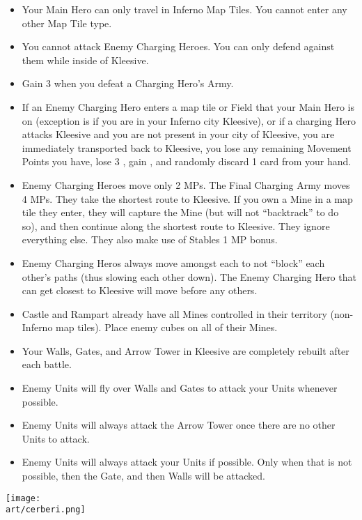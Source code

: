 \begin{multicols*}{2}
\begin{itemize}
  \item Your Main Hero can only travel in Inferno Map Tiles. You cannot enter any other Map Tile type.
  \item You cannot attack Enemy Charging Heroes. You can only defend against them while inside of Kleesive.
  \item Gain 3  when you defeat a Charging Hero's Army.
  \item If an Enemy Charging Hero enters a map tile or Field that your Main Hero is on (exception is if you are in
    your Inferno city Kleesive), or if a charging Hero attacks Kleesive and you are not present in your city
    of Kleesive, you are immediately transported back to Kleesive, you lose any remaining Movement Points
    you have, lose 3 , gain , and randomly discard 1 card from your hand.
  \item Enemy Charging Heroes move only 2 MPs. The Final Charging Army moves 4 MPs. They take the shortest
    route to Kleesive. If you own a Mine in a map tile they enter, they will capture the Mine (but will not
    ``backtrack'' to do so), and then continue along the shortest route to Kleesive. They ignore everything
    else. They also make use of Stables 1 MP bonus.
  \item Enemy Charging Heros always move amongst each to not ``block'' each other's paths (thus slowing each
    other down). The Enemy Charging Hero that can get closest to Kleesive will move before any others.
  \item Castle and Rampart already have all Mines controlled in their territory (non-Inferno map tiles). Place enemy
    cubes on all of their Mines.
  \item Your Walls, Gates, and Arrow Tower in Kleesive are completely rebuilt after each battle.
  \item Enemy  Units will fly over Walls and Gates to attack your Units whenever possible.
  \item Enemy  Units will always attack the Arrow Tower once there are no other  Units to attack.
  \item Enemy Units will always attack your Units if possible. Only when that is not possible, then the Gate,
    and then Walls will be attacked.
\end{itemize}

\vspace*{\fill}
\texttt{[image: \\art/cerberi.png]}
\vspace*{\fill}

\end{multicols*}

